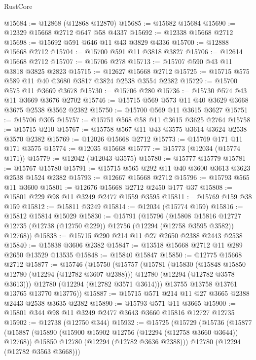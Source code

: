 \begin{lexlean}{RustCore}
\begin{coremodule}
@15684 := @12868 (@12868 @12870)
@15685 := @15682 @15684
@15690 := @12329 @15668 @2712 @647 @58 @4337
@15692 := @12338 @15668 @2712
@15698 := @15692 @591 @646 @11 @43 @3829 @4336
@15700 := @12888 @15668 @2712
@15704 := @15700 @591 @11 @3818 @3827
@15706 := @12614 @15668 @2712
@15707 := @15706 @278
@15713 := @15707 @590 @43 @11 @3818 @3825 @2823
@15715 := @12627 @15668 @2712
@15725 := @15715 @575 @589 @11 @40 @3680 @3817 @3824 @2538 @3554 @2382
@15729 := @15700 @575 @11 @3669 @3678
@15730 := @15706 @280
@15736 := @15730 @574 @43 @11 @3669 @3676 @2702
@15746 := @15715 @569 @573 @11 @40 @3629 @3668 @3675 @2538 @3562 @2382
@15750 := @15700 @569 @11 @3615 @3627
@15751 := @15706 @305
@15757 := @15751 @568 @58 @11 @3615 @3625 @2764
@15758 := @15715 @210
@15767 := @15758 @567 @11 @43 @3575 @3614 @3624 @2538 @3570 @2382
@15769 := @12026 @15668 @2712
@15773 := @15769 @171 @11 @171 @3575
@15774 := @12035 @15668
@15777 := @15773 (@12034 (@15774 @171))
@15779 := @12042 (@12043 @3575)
@15780 := @15777 @15779
@15781 := @15767 @15780
@15791 := @15715 @565 @292 @11 @40 @3600 @3613 @3623 @2538 @1524 @2382
@15793 := @12667 @15668 @2712
@15796 := @15793 @565 @11 @3600
@15801 := @12676 @15668 @2712 @2450 @177 @37
@15808 := @15801 @229 @98 @11 @3249 @2477 @1559 @3595
@15811 := @15769 @159 @38 @159
@15812 := @15811 @3249
@15814 := @12034 (@15774 @159)
@15816 := @15812 @15814 @15029
@15830 := @15791
    (@15796
      (@15808
        @15816
        @12727
        @12735
        (@12738 (@12750 @229))
        @12756
        (@12294 (@12758 @3595 @3582))
        @12768))
@15838 := @15715 @290 @214 @11 @27 @2650 @2388 @2443 @2538
@15840 := @15838 @3606 @2382
@15847 := @13518 @15668 @2712 @11 @289 @2650 @13529 @13535
@15848 := @15840 @15847
@15850 := @12775 @15668 @2712
@15877 := @15746
    (@15750
      (@15757
        (@15781
          (@15830
            (@15848 @15850 @12780 (@12294 (@12782 @3607 @2388)))
            @12780
            (@12294 (@12782 @3578 @3613)))
          @12780
          (@12294 (@12782 @3571 @3614)))
        @13755
        @13758
        @13761
        @13765
        @13770
        @13776))
@15887 := @15715 @571 @214 @11 @27 @3665 @2388 @2443 @2538 @3635 @2382
@15890 := @15793 @571 @11 @3665
@15900 := @15801 @344 @98 @11 @3249 @2477 @3643 @3660 @15816 @12727 @12735
@15902 := @12738 (@12750 @344)
@15932 := @15725
    (@15729
      (@15736
        (@15877
          (@15887
            (@15890 (@15900 @15902 @12756 (@12294 (@12758 @3660 @3644)) @12768))
            @15850
            @12780
            (@12294 (@12782 @3636 @2388)))
          @12780
          (@12294 (@12782 @3563 @3668)))

\end{coremodule}
\end{lexlean}
